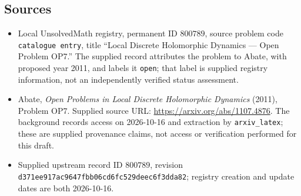 \documentclass[11pt]{article}
\begin{document}
\subsection{Sources}
\begin{itemize}
\item Local UnsolvedMath registry, permanent ID \(800789\), source problem code \texttt{catalogue entry}, title ``Local Discrete Holomorphic Dynamics --- Open Problem OP7.'' The supplied record attributes the problem to Abate, with proposed year 2011, and labels it \texttt{open}; that label is supplied registry information, not an independently verified status assessment.
\item Abate, \emph{Open Problems in Local Discrete Holomorphic Dynamics} (2011), Problem OP7. Supplied source URL: \url{https://arxiv.org/abs/1107.4876}. The background records access on 2026-10-16 and extraction by \texttt{arxiv\_latex}; these are supplied provenance claims, not access or verification performed for this draft.
\item Supplied upstream record ID \(800789\), revision \texttt{d371ee917ac9647fbb06cd6fc529deec6f3dda82}; registry creation and update dates are both 2026-10-16.
\end{itemize}
\end{document}
